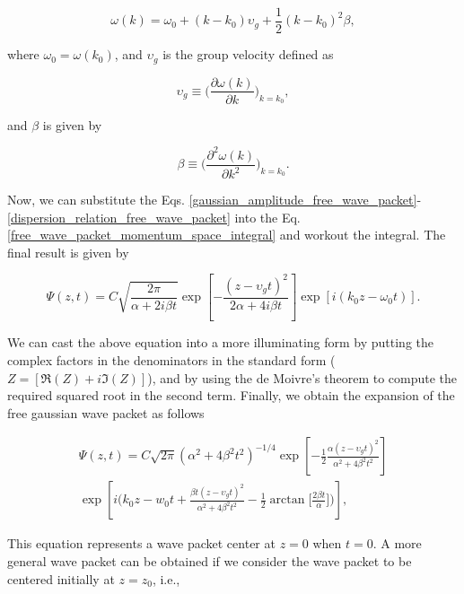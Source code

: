 \documentclass{article}
\begin{document}
\begin{equation}\label{dispersion_relation_free_wave_packet}
    \omega(k) = \omega_{0} + (k-k_{0})\upsilon_{g} + \frac{1}{2}(k-k_{0})^{2} \beta ,
\end{equation}

where $\omega_{0}=\omega(k_{0})$, and $\upsilon_{g}$ is the group velocity defined as

\begin{equation}
    \upsilon_{g} \equiv \bigg(\frac{\partial \omega(k)}{\partial k}\bigg)_{k=k_{0}},
\end{equation}

and $\beta$ is given by

\begin{equation}
    \beta \equiv \bigg(\frac{\partial^2 \omega(k)}{\partial k^2}\bigg)_{k=k_{0}}.
\end{equation}

Now, we can substitute the Eqs. \ref{gaussian_amplitude_free_wave_packet}-\ref{dispersion_relation_free_wave_packet} into the Eq. \ref{free_wave_packet_momentum_space_integral} and workout the integral. The final result is given by

\begin{equation}
    \Psi (z, t) = C \sqrt{\frac{2 \pi}{\alpha + 2 i \beta t}} \exp \left[{-\frac{(z - \upsilon_{g} t)^{2}}{2 \alpha + 4 i \beta t}} \right]  \exp[{i (k_{0}z-\omega_{0} t)}].
\end{equation}

We can cast the above equation into a more illuminating form by putting the complex factors in the denominators in the standard form ($Z = [\Re(Z)+i\Im(Z)]$), and by using the de Moivre's theorem to compute the required squared root in the second term. Finally, we obtain the expansion of the free gaussian wave packet as follows

\begin{multline}\label{free_wave_packet_position_space_centered_0} 
    \Psi (z, t) = C \sqrt{2 \pi} (\alpha^{2} + 4\beta^{2}t^{2})^{-1/4} \exp \left[-\frac{1}{2} \frac{\alpha (z - \upsilon_{g} t)^{2}}{\alpha^{2} + 4\beta^{2}t^{2}}  \right] \\ \exp \left[i \bigg(k_{0}z - w_{0}t + \frac{\beta t (z - \upsilon_{g} t)^{2}}{\alpha^{2} + 4\beta^{2}t^{2}} - \frac{1}{2} \arctan\bigg[\frac{2 \beta t}{\alpha}\bigg]\bigg) \right],
\end{multline}

This equation represents a wave packet center at $z=0$ when $t=0$. A more general wave packet can be obtained if we consider the wave packet to be centered initially at $z=z_{0}$, i.e.,
\end{document}
